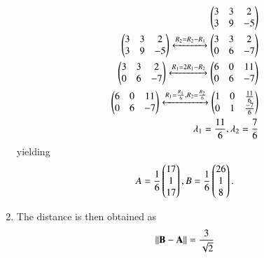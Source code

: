 \begin{enumerate}[label=\thesubsection.\arabic*.,ref=\thesubsection.\theenumi]
\begin{align}
    \begin{pmatrix}3 & 3 &2\\ 3 & 9 & -5\end{pmatrix}\\
    \begin{pmatrix}3 & 3 &2\\ 3 & 9 & -5\end{pmatrix}\xleftrightarrow{R_2=R_2-R_1}\begin{pmatrix}3 & 3 &2\\ 0 & 6 & -7\end{pmatrix}\\
    \begin{pmatrix}3 & 3 &2\\ 0 & 6 & -7\end{pmatrix}\xleftrightarrow{R_1=2R_1-R_2}\begin{pmatrix}6 & 0 & 11\\ 0 & 6 & -7\end{pmatrix}\\
    \begin{pmatrix}6 & 0 & 11\\ 0 & 6 & -7\end{pmatrix}\xleftrightarrow{R_1=\frac{R_1}{6},R_2=\frac{R_2}{6}}\begin{pmatrix}1 & 0 & \frac{11}{6}\\ 0 & 1 & \frac{-7}{6}\end{pmatrix}\\
    \lambda_1=\frac{11}{6},\lambda_2=\frac{7}{6}
\end{align}
yielding
\begin{align}
A=\frac{1}{6}\begin{pmatrix}17\\1\\17\end{pmatrix},
B=\frac{1}{6}\begin{pmatrix}26\\1\\8\end{pmatrix}. 
\end{align}
%
\item The distance is then obtained as
\begin{align}
    \left\lVert\mathbf{B}-\mathbf{A}\right\rVert 
    =\frac{3}{\sqrt{2}}
\end{align}
%

\end{enumerate}
